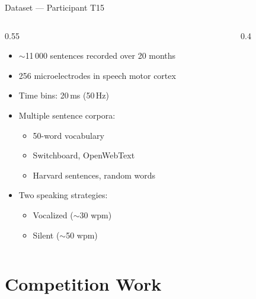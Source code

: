\documentclass[aspectratio=169]{beamer}
\begin{document}
\begin{frame}{Dataset — Participant T15}
  \begin{columns}
    \begin{column}{0.55\textwidth}
      \begin{itemize}
        \item $\sim$11\,000 sentences recorded over 20 months
        \item 256 microelectrodes in speech motor cortex
        \item Time bins: 20\,ms (50\,Hz)
        \item Multiple sentence corpora:
          \begin{itemize}
            \item 50-word vocabulary
            \item Switchboard, OpenWebText
            \item Harvard sentences, random words
          \end{itemize}
        \item Two speaking strategies:
          \begin{itemize}
            \item Vocalized ($\sim$30 wpm)
            \item Silent ($\sim$50 wpm)
          \end{itemize}
      \end{itemize}
    \end{column}
    \begin{column}{0.4\textwidth}
      \begin{center}
      \end{center}
    \end{column}
  \end{columns}
\end{frame}

\section{Competition Work}
\end{document}
